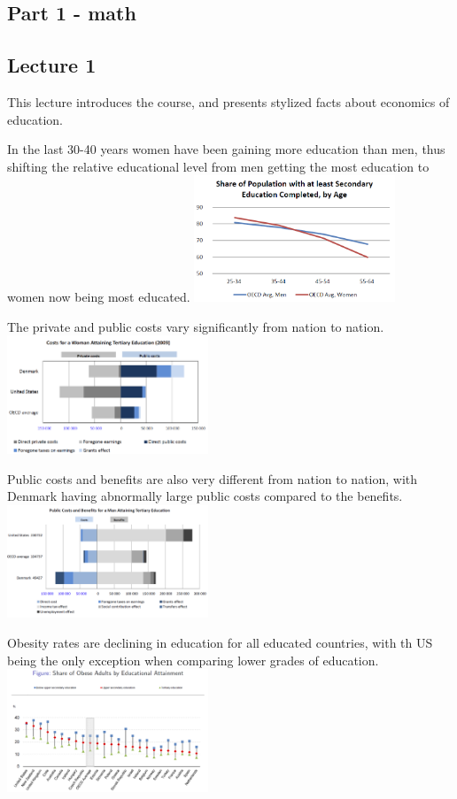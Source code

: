 \documentclass[12pt, a4paper]{article}
\begin{document}
\begin{multicols}{2}
\section{Part 1 - math}
\subsection{Lecture 1}
This lecture introduces the course, and presents stylized facts about economics of education.

In the last 30-40 years women have been gaining more education than men, thus shifting the relative educational level from men getting the most education to women now being most educated.
\includegraphics[width = 0.45\textwidth]{MFrates.PNG}

The private and public costs vary significantly from nation to nation.
\includegraphics[width = 0.45\textwidth]{Capture.PNG}

Public costs and benefits are also very different from nation to nation, with Denmark having abnormally large public costs compared to the benefits.
\includegraphics[width = 0.45\textwidth]{costben.PNG}

Obesity rates are declining in education for all educated countries, with th US being the only exception when comparing lower grades of education.
\includegraphics[width = 0.45\textwidth]{obese.PNG}


\end{multicols}
\end{document}
